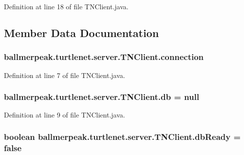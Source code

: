 Definition at line 18 of file T\-N\-Client.\-java.



\subsection{Member Data Documentation}
\hypertarget{classballmerpeak_1_1turtlenet_1_1server_1_1TNClient_a5f3a2db779658358496e57ddc06ca612}{
\subsubsection[{connection}]{ ballmerpeak.\-turtlenet.\-server.\-T\-N\-Client.\-connection}}\label{classballmerpeak_1_1turtlenet_1_1server_1_1TNClient_a5f3a2db779658358496e57ddc06ca612}


Definition at line 7 of file T\-N\-Client.\-java.

\hypertarget{classballmerpeak_1_1turtlenet_1_1server_1_1TNClient_a71515570b30a73fbd91017c811dad2ba}{
\subsubsection[{db}]{ ballmerpeak.\-turtlenet.\-server.\-T\-N\-Client.\-db = null}}\label{classballmerpeak_1_1turtlenet_1_1server_1_1TNClient_a71515570b30a73fbd91017c811dad2ba}


Definition at line 9 of file T\-N\-Client.\-java.

\hypertarget{classballmerpeak_1_1turtlenet_1_1server_1_1TNClient_aec7ed1884c5ebaaff15d83de15086ef2}{
\subsubsection[{db\-Ready}]{\setlength{\rightskip}{0pt plus 5cm}boolean ballmerpeak.\-turtlenet.\-server.\-T\-N\-Client.\-db\-Ready = false}}\label{classballmerpeak_1_1turtlenet_1_1server_1_1TNClient_aec7ed1884c5ebaaff15d83de15086ef2}


